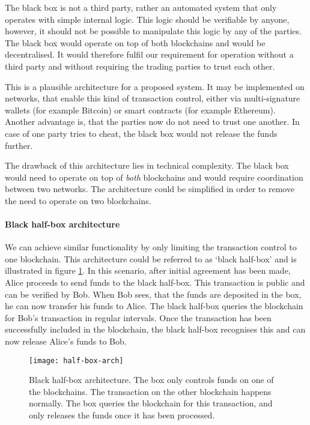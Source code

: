 The black box is not a third party, rather an automated system that only operates with simple internal logic. This logic should be verifiable by anyone, however, it should not be possible to manipulate this logic by any of the parties. The black box would operate on top of both blockchains and would be decentralised. It would therefore fulfil our requirement for operation without a third party and without requiring the trading parties to trust each other.

This is a plausible architecture for a proposed system. It may be implemented on networks, that enable this kind of transaction control, either via multi-signature wallets (for example Bitcoin) or smart contracts (for example Ethereum). Another advantage is, that the parties now do not need to trust one another. In case of one party tries to cheat, the black box would not release the funds further.

The drawback of this architecture lies in technical complexity. The black box would need to operate on top of \textit{both} blockchains and would require coordination between two networks. The architecture could be simplified in order to remove the need to operate on two blockchains.

\paragraph{Black half-box architecture}
We can achieve similar functionality by only limiting the transaction control to one blockchain. This architecture could be referred to as `black half-box' and is illustrated in figure \ref{fig:half-box-arch}. In this scenario, after initial agreement has been made, Alice proceeds to send funds to the black half-box. This transaction is public and can be verified by Bob. When Bob sees, that the funds are deposited in the box, he can now transfer his funds to Alice. The black half-box queries the blockchain for Bob's transaction in regular intervals. Once the transaction has been successfully included in the blockchain, the black half-box recognises this and can now release Alice's funds to Bob.
% 
\begin{figure}[ht]
    \centering
    \texttt{[image: half-box-arch]}
    \caption{Black half-box architecture. The box only controls funds on one of the blockchains. The transaction on the other blockchain happens normally. The box queries the blockchain for this transaction, and only releases the funds once it has been processed.}
    \label{fig:half-box-arch}
\end{figure}

